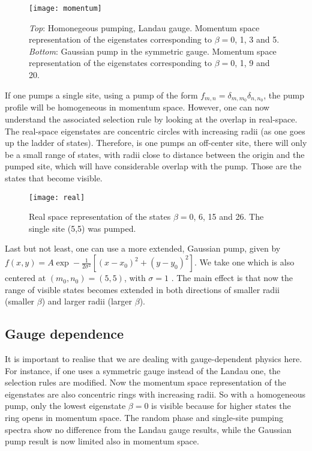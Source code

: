 \documentclass[twocolumn, 10pt, aps, superscriptaddress, floatfix, showpacs, prb, citeautoscript]{revtex4-1}
\newcommand{\co}[2]{#2}
\renewcommand{\paragraph}{\co}
\begin{document}
\begin{figure}[htb]\centering
  \texttt{[image: momentum]}
  \caption{\emph{Top}: Homonegeous pumping, Landau gauge. Momentum
    space representation of the eigenstates corresponding to
    $\beta=0$, 1, 3 and 5.  
    \emph{Bottom}: Gaussian pump in the
    symmetric gauge. Momentum space representation of the eigenstates
    corresponding to $\beta=0$, 1, 9 and 20.}
  \label{fig:hom_mom_sp}
\end{figure}



\paragraph{$\delta$-like pump}
If one pumps a single site, using a pump of the form $f_{m,n} =
\delta_{m,m_0} \delta_{n,n_0}$, the pump profile will be homogeneous
in momentum space.  However, one can now understand the associated
selection rule by looking at the overlap in real-space. The real-space
eigenstates are concentric circles with increasing radii (as one goes
up the ladder of states). Therefore, is one pumps an off-center site,
there will only be a small range of states, with radii close to
distance between the origin and the pumped site, which will have
considerable overlap with the pump. Those are the states that become
visible.

\begin{figure}[htb]
  \centering
  \texttt{[image: real]}
  \caption{Real space representation of the states $\beta=0$, 6, 15
    and 26. The single site (5,5) was pumped.}
  \label{fig:delta_real_sp}
\end{figure}


\paragraph{Gaussian pump}
Last but not least, one can use a more extended, Gaussian pump, given
by \(f(x,y) = A \exp- \frac{1}{2\sigma^2} \left[(x-x_0)^2 + (y-y_0)^2
\right]\). We take one which is also centered at \((m_0,n_0) = (5,5)\),
with \(\sigma =1\) . The main effect is that now the range of visible
states becomes extended in both directions of smaller radii (smaller
\(\beta\)) and larger radii (larger \(\beta\)).

\subsection{Gauge dependence}
\label{sec:gauge}
It is important to realise that we are dealing with gauge-dependent
physics here. For instance, if one uses a symmetric gauge instead of
the Landau one, the selection rules are modified. Now the momentum
space representation of the eigenstates are also concentric rings with
increasing radii. So with a homogeneous pump, only the lowest
eigenstate $\beta=0$ is visible because for higher states the ring
opens in momentum space. The random phase and single-site pumping
spectra show no difference from the Landau gauge results, while the
Gaussian pump result is now limited also in momentum space.
\end{document}
